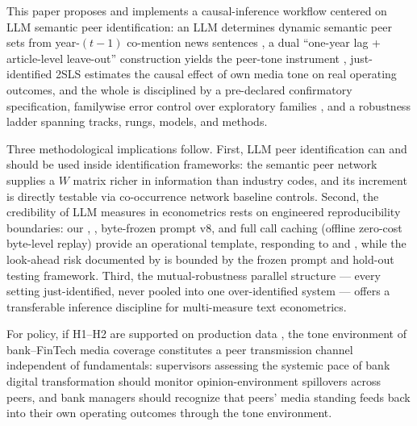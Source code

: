 This paper proposes and implements a causal-inference workflow centered on LLM semantic peer
identification: an LLM determines dynamic semantic peer sets from year-$(t-1)$ co-mention
news sentences \parencite{cao2025genai}, a dual ``one-year lag + article-level leave-out''
construction yields the peer-tone instrument \parencite{leary2014peerfirms,
manski1993reflection,bramoulle2009networks}, just-identified 2SLS estimates the causal effect
of own media tone on real operating outcomes, and the whole is disciplined by a pre-declared
confirmatory specification, familywise error control over exploratory families
\parencite{romano2005stepdown}, and a robustness ladder spanning tracks, rungs, models, and
methods. 

Three methodological implications follow. First, LLM peer identification can and should be
used inside identification frameworks: the semantic peer network supplies a $W$ matrix richer
in information than industry codes, and its increment is directly testable via co-occurrence
network baseline controls. Second, the credibility of LLM measures in econometrics rests on
engineered reproducibility boundaries: our , , byte-frozen
prompt v8, and full call caching (offline zero-cost byte-level replay) provide an operational
template, responding to \textcite{baumann2025llmhacking} and \textcite{ludwig2025llmframework},
while the look-ahead risk documented by \textcite{levy2026lookahead} is bounded by the frozen
prompt and hold-out testing framework. Third, the mutual-robustness parallel structure ---
every setting just-identified, never pooled into one over-identified system --- offers a
transferable inference discipline for multi-measure text econometrics.

For policy, if H1--H2 are supported on production data , the tone environment of bank--FinTech media coverage constitutes a peer
transmission channel independent of fundamentals: supervisors assessing the systemic pace of
bank digital transformation should monitor opinion-environment spillovers across peers, and
bank managers should recognize that peers' media standing feeds back into their own operating
outcomes through the tone environment.

